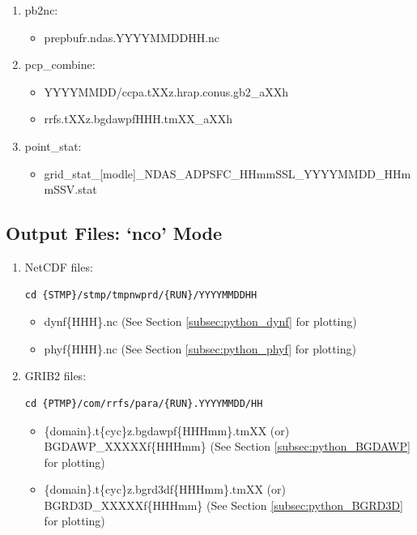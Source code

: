 \documentclass[11pt,fleqn]{report}              %
\begin{document}
\begin{enumerate}
\begin{enumerate}
\item pb2nc:
\begin{itemize}
\item prepbufr.ndas.YYYYMMDDHH.nc
\end{itemize}

\item pcp\_combine:
\begin{itemize}
\item YYYYMMDD/ccpa.tXXz.hrap.conus.gb2\_aXXh
\item rrfs.tXXz.bgdawpfHHH.tmXX\_aXXh
\end{itemize}

\item point\_stat:
\begin{itemize}
\item grid\_stat\_[modle]\_NDAS\_ADPSFC\_HHmmSSL\_YYYYMMDD\_HHmmSSV.stat
\end{itemize}

\end{enumerate}


\end{enumerate}




\subsection{Output Files: `nco' Mode}
\label{subsec:wflow_output_nco}

\begin{enumerate}
\item NetCDF files:

\lstset{language=bash}   
\begin{lstlisting}[frame=trBL]
cd {STMP}/stmp/tmpnwprd/{RUN}/YYYYMMDDHH
\end{lstlisting}

\begin{itemize}
\item dynf\{HHH\}.nc (See Section \ref{subsec:python_dynf} for plotting)
\item phyf\{HHH\}.nc (See Section \ref{subsec:python_phyf} for plotting)
\end{itemize}


\item GRIB2 files:

\lstset{language=bash}   
\begin{lstlisting}[frame=trBL]
cd {PTMP}/com/rrfs/para/{RUN}.YYYYMMDD/HH
\end{lstlisting}

\begin{itemize}
\item \{domain\}.t\{cyc\}z.bgdawpf\{HHHmm\}.tmXX (or) BGDAWP\_XXXXXf\{HHHmm\} (See Section \ref{subsec:python_BGDAWP} for plotting)
\item \{domain\}.t\{cyc\}z.bgrd3df\{HHHmm\}.tmXX (or) BGRD3D\_XXXXXf\{HHHmm\} (See Section \ref{subsec:python_BGRD3D} for plotting)
\end{itemize}

\end{enumerate}
\end{document}
